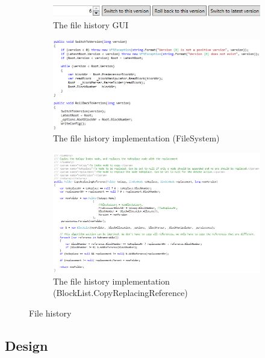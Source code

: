 \documentclass[JCDReport.tex]{subfiles}
\begin{document}
\begin{figure}[h!]
	\begin{subfigure}[b]{1\textwidth}
		\centering
		\includegraphics[scale=1]{Images/history.png}
		\caption{The file history GUI}
	\end{subfigure}
	
	\begin{subfigure}[b]{1\textwidth}
		\centering
		\includegraphics[scale=0.5]{Images/history_implementation.png}
		\caption{The file history implementation (FileSystem)}
	\end{subfigure}
	
	\begin{subfigure}[b]{1\textwidth}
		\centering
		\includegraphics[scale=0.5]{Images/history_copy_replacing_reference.png}
		\caption{The file history implementation (BlockList.CopyReplacingReference)}
	\end{subfigure}
	\caption{File history}
\end{figure}


\subsection{Design}
\end{document}
